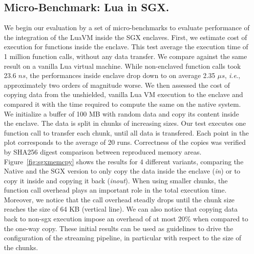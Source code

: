 \subsection{Micro-Benchmark: Lua in SGX.}
We begin our evaluation by a set of micro-benchmarks to evaluate performance of the integration of the LuaVM inside the SGX enclaves.
First, we estimate cost of execution for functions inside the enclave.
This test average the execution time of 1 million function calls, without any data transfer.
We compare against the same result on a vanilla Lua virtual machine.
While non-enclaved function calls took 23.6 $ns$, the performances inside  enclave drop down to on average 2.35 $\mu s$, \textit{i.e}., approximately two orders of magnitude worse.
We then assessed the cost of copying data from the unshielded, vanilla Lua VM execution to the enclave and compared it with the time required to compute the same on the native system.
We initialize a buffer of 100 MB with random data and copy its content inside the enclave. 
The data is split in  chunks of increasing sizes.
Our test executes one function call to transfer each chunk, until all data is transfered.
Each point in the plot corresponds to the average of 20 runs. 
Correctness of the copies was verified by SHA256 digest comparison between reproduced memory areas.
Figure~\ref{fig:sgxmemcpy} shows the results for 4 different variants, comparing the Native and the SGX version to only copy the data inside the enclave (\emph{in}) or to copy it inside and copying it back (\emph{in\/out}).
When using smaller chunks, the function call overhead plays an important role in the total execution time.
Moreover, we notice that the call overhead steadly drops until the chunk size reaches the size of 64 KB (vertical line).
We can also notice that copying data back to non-sgx execution impose an overhead of at most 20\% when compared to the one-way copy.
These initial results can be used as guidelines to drive the configuration of the streaming pipeline, in particular with respect to the size of the chunks. %

